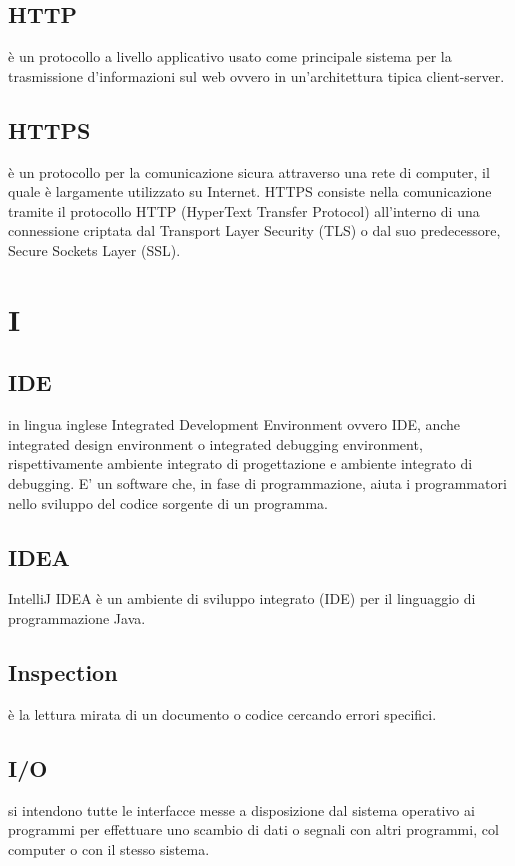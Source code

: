 \documentclass[12pt,a4paper]{article}
\begin{document}
\subsection{HTTP} 
 è un protocollo a livello applicativo usato come principale sistema per la trasmissione d'informazioni sul web ovvero in un'architettura tipica client-server.

\subsection{HTTPS} 
 è un protocollo per la comunicazione sicura attraverso una rete di computer, il quale è largamente utilizzato su Internet. HTTPS consiste nella comunicazione tramite il protocollo HTTP (HyperText Transfer Protocol) all'interno di una connessione criptata dal Transport Layer Security (TLS) o dal suo predecessore, Secure Sockets Layer (SSL).

\newpage

\section{I}	


\subsection{IDE}
in lingua inglese Integrated Development Environment ovvero IDE, anche integrated design environment o integrated debugging environment, rispettivamente ambiente integrato di progettazione e ambiente integrato di debugging. E' un software che, in fase di programmazione, aiuta i programmatori nello sviluppo del codice sorgente di un programma.

\subsection{IDEA}
IntelliJ IDEA è un ambiente di sviluppo integrato (IDE) per il linguaggio di programmazione Java.

\subsection{Inspection} 
 è la lettura mirata di un documento o codice cercando errori specifici.

\subsection{I/O} 
si intendono tutte le interfacce messe a disposizione dal sistema operativo ai programmi per effettuare uno scambio di dati o segnali con altri programmi, col computer o con il stesso sistema.
\end{document}
